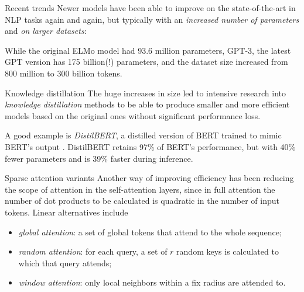\documentclass[style=upen, size=14pt]{powerdot}
\newcommand{\gold}{\color{arany}}
\theoremstyle{definition}
\begin{document}
\begin{slide}[toc=Recent trends]{Recent trends}
  Newer models have been able to improve on the state-of-the-art in NLP tasks
  again and again, but typically with an \emph{\gold increased number of
    parameters} and \emph{\gold on larger datasets}:\bigskip

  While the original ELMo model had 93.6 million parameters, GPT-3, the latest
  GPT version has 175 billion(!) parameters, and the dataset size increased from
  800 million to 300 billion tokens.
\end{slide}

\begin{slide}[toc=Distillation]{Knowledge distillation}
  The huge increases in size led to intensive research into \emph{knowledge
    distillation} methods to be able to produce smaller and more efficient
  models based on the original ones without significant performance
  loss.\bigskip

  A good example is \emph{\gold DistilBERT}, a distilled version of BERT trained
  to mimic BERT's output \citep{sanh2019distilbert}. DistilBERT retains 97\% of
  BERT's performance, but with 40\% fewer parameters and is 39\% faster during
  inference.
\end{slide}

\begin{slide}[toc=Sparse attention]{Sparse attention variants}
  Another way of improving efficiency has been reducing the scope of attention
  in the self-attention layers, since in full attention the number of dot
  products to be calculated is quadratic in the number of input tokens. Linear
  alternatives include
  \begin{itemize}
  \item \emph{\gold global attention}: a set of global tokens that attend to
    the whole sequence;
  \item \emph{\gold random attention}: for each query, a set of $r$ random keys
    is calculated to which that query attends;
  \item \emph{\gold window attention}: only local neighbors within a fix radius
    are attended to.
  \end{itemize}
\end{slide}
\end{document}
